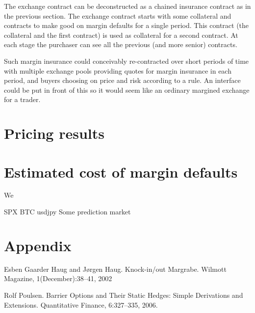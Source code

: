 \documentclass[12pt]{article}
\begin{document}
The exchange contract can be deconstructed as a chained insurance contract as in the previous section. The exchange contract starts with some collateral and contracts to make good on margin defaults for a single period. This contract (the collateral and the first contract) is used as collateral for a second contract. At each stage the purchaser can see all the previous (and more senior) contracts.

Such margin insurance could conceivably re-contracted over short periods of time with multiple exchange pools providing quotes for margin insurance in each period, and buyers choosing on price and risk according to a rule. An interface could be put in front of this so it would seem like an ordinary margined exchange for a trader.

\section{Pricing results}

\section{Estimated cost of margin defaults}

We 

SPX
BTC
usdjpy
Some prediction market




\section*{Appendix}










\begin{thebibliography}{}


 Esben Gaarder Haug and Jørgen Haug. Knock-in/out Margrabe. Wilmott Magazine, 1(December):38–41, 2002

 Rolf Poulsen. Barrier Options and Their Static Hedges: Simple Derivations and
Extensions. Quantitative Finance, 6:327–335, 2006.







\end{thebibliography}
\end{document}
